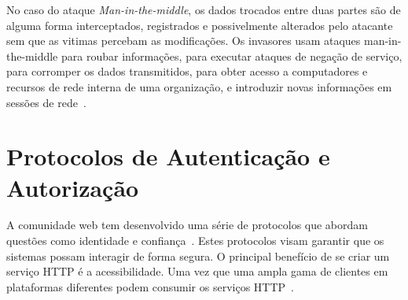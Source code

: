 No caso do ataque \emph{Man-in-the-middle}, os dados trocados entre duas partes são de alguma forma interceptados, registrados e possivelmente alterados pelo atacante sem que as vitimas percebam as modificações. Os invasores usam ataques man-in-the-middle para roubar informações, para executar ataques de negação de serviço, para corromper os dados transmitidos, para obter acesso a computadores e recursos de rede interna de uma organização, e introduzir novas informações em sessões de rede~\cite{kim2010fundamentals}.






\section{Protocolos de Autenticação e Autorização}
A comunidade web tem desenvolvido uma série de protocolos que abordam questões como identidade e confiança~\cite{Webber10}. Estes protocolos visam garantir que os sistemas possam interagir de forma segura. O principal benefício de se criar um serviço HTTP é a acessibilidade. Uma vez que uma ampla gama de clientes em plataformas diferentes podem consumir os serviços HTTP~\cite{lakshmiraghavan2013pro}.


